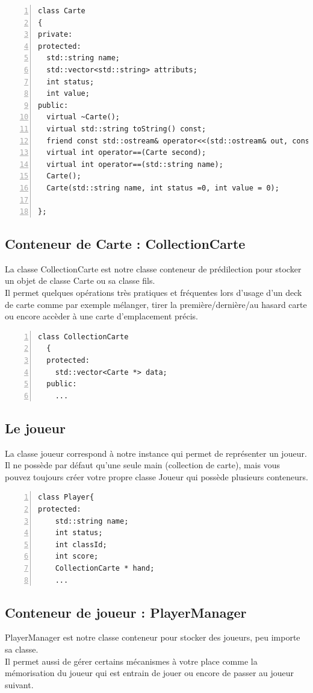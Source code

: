 \documentclass[12pt, letterpaper]{article}
\begin{document}
\begin{Verbatim}[numbers=left,xleftmargin = 5mm]
class Carte
{
private:
protected:
  std::string name;
  std::vector<std::string> attributs;
  int status;
  int value; 
public:
  virtual ~Carte();
  virtual std::string toString() const;
  friend const std::ostream& operator<<(std::ostream& out, const Carte& mat);
  virtual int operator==(Carte second);
  virtual int operator==(std::string name);
  Carte();
  Carte(std::string name, int status =0, int value = 0);

};
\end{Verbatim}

\subsection{Conteneur de Carte : CollectionCarte }
La classe CollectionCarte est notre classe conteneur de prédilection pour stocker un objet de classe Carte ou sa classe fils.\\
Il permet quelques opérations très pratiques et fréquentes lors d'usage d'un deck de carte comme par exemple mélanger, tirer la première/dernière/au hasard carte
ou encore accèder à une carte d'emplacement précis.

\begin{Verbatim}[numbers=left,xleftmargin = 5mm]
  class CollectionCarte
  {
  protected:
    std::vector<Carte *> data;
  public:
    ...
\end{Verbatim}
 
\subsection{Le joueur}
La classe joueur correspond à notre instance qui permet de représenter un joueur. Il ne possède par défaut qu'une seule main (collection de carte),
mais vous pouvez toujours créer votre propre classe Joueur qui possède plusieurs conteneurs.

\begin{Verbatim}[numbers=left,xleftmargin = 5mm]
class Player{
protected:
    std::string name;
    int status;
    int classId;
    int score;
    CollectionCarte * hand;
    ...
\end{Verbatim} 

\subsection{Conteneur de joueur : PlayerManager}
PlayerManager est notre classe conteneur pour stocker des joueurs, peu importe sa classe.\\
Il permet aussi de gérer certains mécanismes à votre place comme la mémorisation du joueur qui est entrain de jouer 
ou encore de passer au joueur suivant.
\end{document}
